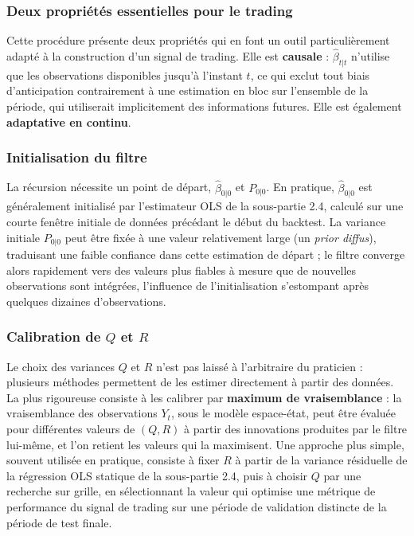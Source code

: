 \documentclass{article}
\begin{document}
\subsubsection*{Deux propriétés essentielles pour le trading}
Cette procédure présente deux propriétés qui en font un outil particulièrement adapté à la construction d'un signal de trading. Elle est \textbf{causale} : $\hat\beta_{t|t}$ n'utilise que les observations disponibles jusqu'à l'instant $t$, ce qui exclut tout biais d'anticipation  contrairement à une estimation en bloc sur l'ensemble de la période, qui utiliserait implicitement des informations futures. Elle est également \textbf{adaptative en continu}.
\subsubsection*{Initialisation du filtre}
La récursion nécessite un point de départ, $\hat\beta_{0|0}$ et $P_{0|0}$. En pratique, $\hat\beta_{0|0}$ est généralement initialisé par l'estimateur OLS de la sous-partie 2.4, calculé sur une courte fenêtre initiale de données précédant le début du backtest. La variance initiale $P_{0|0}$ peut être fixée à une valeur relativement large (un \emph{prior diffus}), traduisant une faible confiance dans cette estimation de départ ; le filtre converge alors rapidement vers des valeurs plus fiables à mesure que de nouvelles observations sont intégrées, l'influence de l'initialisation s'estompant après quelques dizaines d'observations.
\subsubsection*{Calibration de $Q$ et $R$}
Le choix des variances $Q$ et $R$ n'est pas laissé à l'arbitraire du praticien : plusieurs méthodes permettent de les estimer directement à partir des données. La plus rigoureuse consiste à les calibrer par \textbf{maximum de vraisemblance} : la vraisemblance des observations $Y_t$, sous le modèle espace-état, peut être évaluée pour différentes valeurs de $(Q, R)$ à partir des innovations produites par le filtre lui-même, et l'on retient les valeurs qui la maximisent. Une approche plus simple, souvent utilisée en pratique, consiste à fixer $R$ à partir de la variance résiduelle de la régression OLS statique de la sous-partie 2.4, puis à choisir $Q$ par une recherche sur grille, en sélectionnant la valeur qui optimise une métrique de performance du signal de trading sur une période de validation distincte de la période de test finale.
\end{document}
